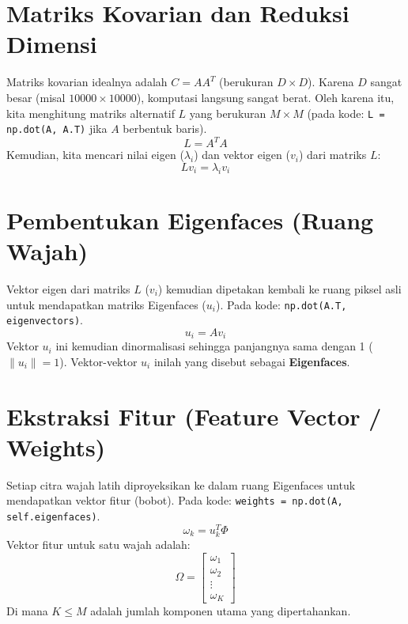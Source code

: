 \documentclass[a4paper,12pt]{article}
\begin{document}
\section{Matriks Kovarian dan Reduksi Dimensi}
Matriks kovarian idealnya adalah $C = A A^T$ (berukuran $D \times D$). Karena $D$ sangat besar (misal $10000 \times 10000$), komputasi langsung sangat berat. Oleh karena itu, kita menghitung matriks alternatif $L$ yang berukuran $M \times M$ (pada kode: \texttt{L = np.dot(A, A.T)} jika $A$ berbentuk baris).
\begin{equation}
    L = A^T A
\end{equation}
Kemudian, kita mencari nilai eigen ($\lambda_i$) dan vektor eigen ($v_i$) dari matriks $L$:
\begin{equation}
    L v_i = \lambda_i v_i
\end{equation}

\section{Pembentukan Eigenfaces (Ruang Wajah)}
Vektor eigen dari matriks $L$ ($v_i$) kemudian dipetakan kembali ke ruang piksel asli untuk mendapatkan matriks Eigenfaces ($u_i$). Pada kode: \texttt{np.dot(A.T, eigenvectors)}.
\begin{equation}
    u_i = A v_i
\end{equation}
Vektor $u_i$ ini kemudian dinormalisasi sehingga panjangnya sama dengan 1 ($\|u_i\| = 1$). Vektor-vektor $u_i$ inilah yang disebut sebagai \textbf{Eigenfaces}.

\section{Ekstraksi Fitur (Feature Vector / Weights)}
Setiap citra wajah latih diproyeksikan ke dalam ruang Eigenfaces untuk mendapatkan vektor fitur (bobot). Pada kode: \texttt{weights = np.dot(A, self.eigenfaces)}.
\begin{equation}
    \omega_k = u_k^T \Phi
\end{equation}
Vektor fitur untuk satu wajah adalah:
\begin{equation}
    \Omega = \begin{bmatrix} \omega_1 \\ \omega_2 \\ \vdots \\ \omega_K \end{bmatrix}
\end{equation}
Di mana $K \leq M$ adalah jumlah komponen utama yang dipertahankan.
\end{document}
